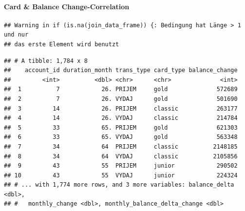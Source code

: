 \documentclass[]{article}
\newenvironment{Shaded}{\begin{snugshade}}{\end{snugshade}}
\newcommand{\ControlFlowTok}[1]{\textcolor[rgb]{0.13,0.29,0.53}{\textbf{#1}}}
\newcommand{\DataTypeTok}[1]{\textcolor[rgb]{0.13,0.29,0.53}{#1}}
\newcommand{\KeywordTok}[1]{\textcolor[rgb]{0.13,0.29,0.53}{\textbf{#1}}}
\newcommand{\NormalTok}[1]{#1}
\newcommand{\OperatorTok}[1]{\textcolor[rgb]{0.81,0.36,0.00}{\textbf{#1}}}
\newcommand{\StringTok}[1]{\textcolor[rgb]{0.31,0.60,0.02}{#1}}
\let\oldparagraph\paragraph
\renewcommand{\paragraph}[1]{\oldparagraph{#1}\mbox{}}
\begin{document}
\hypertarget{card-balance-change-correlation}{%
\paragraph{Card \& Balance
Change-Correlation}\label{card-balance-change-correlation}}

\begin{Shaded}
\end{Shaded}

\begin{verbatim}
## Warning in if (is.na(join_data_frame)) {: Bedingung hat Länge > 1 und nur
## das erste Element wird benutzt
\end{verbatim}

\begin{verbatim}
## # A tibble: 1,784 x 8
##    account_id duration_month trans_type card_type balance_change
##         <int>          <dbl> <chr>      <chr>              <int>
##  1          7            26. PRIJEM     gold              572689
##  2          7            26. VYDAJ      gold              501690
##  3         14            26. PRIJEM     classic           263177
##  4         14            26. VYDAJ      classic           214784
##  5         33            65. PRIJEM     gold              621303
##  6         33            65. VYDAJ      gold              563348
##  7         34            64  PRIJEM     classic          2148185
##  8         34            64  VYDAJ      classic          2105856
##  9         43            55  PRIJEM     junior            290502
## 10         43            55  VYDAJ      junior            224324
## # ... with 1,774 more rows, and 3 more variables: balance_delta <dbl>,
## #   monthly_change <dbl>, monthly_balance_delta_change <dbl>
\end{verbatim}
\end{document}
